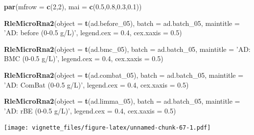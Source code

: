 \documentclass[]{book}
\newenvironment{Shaded}{\begin{snugshade}}{\end{snugshade}}
\newcommand{\KeywordTok}[1]{\textcolor[rgb]{0.13,0.29,0.53}{\textbf{#1}}}
\newcommand{\DataTypeTok}[1]{\textcolor[rgb]{0.13,0.29,0.53}{#1}}
\newcommand{\DecValTok}[1]{\textcolor[rgb]{0.00,0.00,0.81}{#1}}
\newcommand{\FloatTok}[1]{\textcolor[rgb]{0.00,0.00,0.81}{#1}}
\newcommand{\StringTok}[1]{\textcolor[rgb]{0.31,0.60,0.02}{#1}}
\newcommand{\NormalTok}[1]{#1}
\begin{document}
\begin{Shaded}
\begin{Highlighting}[]
\KeywordTok{par}\NormalTok{(}\DataTypeTok{mfrow =} \KeywordTok{c}\NormalTok{(}\DecValTok{2}\NormalTok{,}\DecValTok{2}\NormalTok{), }\DataTypeTok{mai =} \KeywordTok{c}\NormalTok{(}\FloatTok{0.5}\NormalTok{,}\FloatTok{0.8}\NormalTok{,}\FloatTok{0.3}\NormalTok{,}\FloatTok{0.1}\NormalTok{))}

\KeywordTok{RleMicroRna2}\NormalTok{(}\DataTypeTok{object =} \KeywordTok{t}\NormalTok{(ad.before_}\DecValTok{05}\NormalTok{), }\DataTypeTok{batch =}\NormalTok{ ad.batch_}\DecValTok{05}\NormalTok{, }
             \DataTypeTok{maintitle =} \StringTok{'AD: before (0-0.5 g/L)'}\NormalTok{, }\DataTypeTok{legend.cex =} \FloatTok{0.4}\NormalTok{, }
             \DataTypeTok{cex.xaxis =} \FloatTok{0.5}\NormalTok{)}

\KeywordTok{RleMicroRna2}\NormalTok{(}\DataTypeTok{object =} \KeywordTok{t}\NormalTok{(ad.bmc_}\DecValTok{05}\NormalTok{), }\DataTypeTok{batch =}\NormalTok{ ad.batch_}\DecValTok{05}\NormalTok{, }
             \DataTypeTok{maintitle =} \StringTok{'AD: BMC (0-0.5 g/L)'}\NormalTok{, }\DataTypeTok{legend.cex =} \FloatTok{0.4}\NormalTok{, }
             \DataTypeTok{cex.xaxis =} \FloatTok{0.5}\NormalTok{)}

\KeywordTok{RleMicroRna2}\NormalTok{(}\DataTypeTok{object =} \KeywordTok{t}\NormalTok{(ad.combat_}\DecValTok{05}\NormalTok{), }\DataTypeTok{batch =}\NormalTok{ ad.batch_}\DecValTok{05}\NormalTok{, }
             \DataTypeTok{maintitle =} \StringTok{'AD: ComBat (0-0.5 g/L)'}\NormalTok{, }\DataTypeTok{legend.cex =} \FloatTok{0.4}\NormalTok{, }
             \DataTypeTok{cex.xaxis =} \FloatTok{0.5}\NormalTok{)}

\KeywordTok{RleMicroRna2}\NormalTok{(}\DataTypeTok{object =} \KeywordTok{t}\NormalTok{(ad.limma_}\DecValTok{05}\NormalTok{), }\DataTypeTok{batch =}\NormalTok{ ad.batch_}\DecValTok{05}\NormalTok{, }
             \DataTypeTok{maintitle =} \StringTok{'AD: rBE (0-0.5 g/L)'}\NormalTok{, }\DataTypeTok{legend.cex =} \FloatTok{0.4}\NormalTok{, }
             \DataTypeTok{cex.xaxis =} \FloatTok{0.5}\NormalTok{)}
\end{Highlighting}
\end{Shaded}

\texttt{[image: vignette\_files/figure-latex/unnamed-chunk-67-1.pdf]}
\end{document}
